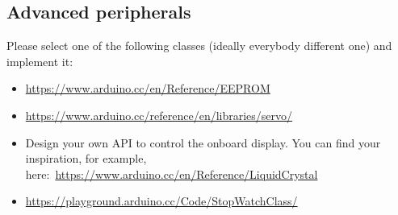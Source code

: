 \documentclass[12pt, a4paper]{article}
\begin{document}
\subsection{Advanced peripherals}
Please select one of the following classes (ideally everybody different one) and implement it:

\begin{itemize}
	\item \url{https://www.arduino.cc/en/Reference/EEPROM}
	\item \url{https://www.arduino.cc/reference/en/libraries/servo/}
	\item Design your own API to control the onboard display. You can find your inspiration, for example, here: \url{https://www.arduino.cc/en/Reference/LiquidCrystal}
	\item \url{https://playground.arduino.cc/Code/StopWatchClass/}
\end{itemize}
\end{document}
